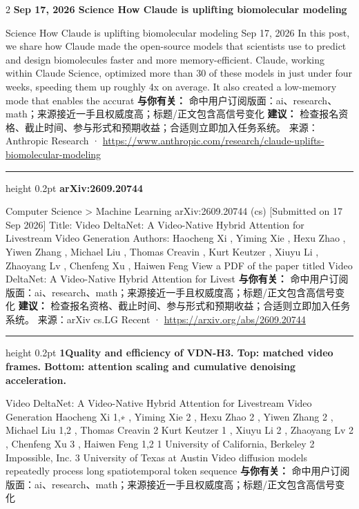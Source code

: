 \documentclass[10.5pt]{ctexart}
\begin{document}
\begin{multicols}{2}
{\large\bfseries Sep 17, 2026 Science How Claude is uplifting biomolecular modeling}\par
Science How Claude is uplifting biomolecular modeling Sep 17, 2026 In this post, we share how Claude made the open-source models that scientists use to predict and design biomolecules faster and more memory-efficient. Claude, working within Claude Science, optimized more than 30 of these models in just under four weeks, speeding them up roughly 4x on average. It also created a low-memory mode that enables the accurat
\textbf{与你有关：} 命中用户订阅版面：ai、research、math；来源接近一手且权威度高；标题/正文包含高信号变化
\textbf{建议：} 检查报名资格、截止时间、参与形式和预期收益；合适则立即加入任务系统。
{\footnotesize\color{ormuted} 来源：Anthropic Research · \url{https://www.anthropic.com/research/claude-uplifts-biomolecular-modeling}}
\vspace{2mm}
\hrule height 0.2pt
\vspace{2mm}
{\large\bfseries arXiv:2609.20744}\par
Computer Science > Machine Learning arXiv:2609.20744 (cs) [Submitted on 17 Sep 2026] Title: Video DeltaNet: A Video-Native Hybrid Attention for Livestream Video Generation Authors: Haocheng Xi , Yiming Xie , Hexu Zhao , Yiwen Zhang , Michael Liu , Thomas Creavin , Kurt Keutzer , Xiuyu Li , Zhaoyang Lv , Chenfeng Xu , Haiwen Feng View a PDF of the paper titled Video DeltaNet: A Video-Native Hybrid Attention for Livest
\textbf{与你有关：} 命中用户订阅版面：ai、research、math；来源接近一手且权威度高；标题/正文包含高信号变化
\textbf{建议：} 检查报名资格、截止时间、参与形式和预期收益；合适则立即加入任务系统。
{\footnotesize\color{ormuted} 来源：arXiv cs.LG Recent · \url{https://arxiv.org/abs/2609.20744}}
\vspace{2mm}
\hrule height 0.2pt
\vspace{2mm}
{\large\bfseries 1Quality and efficiency of VDN-H3. Top: matched video frames. Bottom: attention scaling and cumulative denoising acceleration.}\par
Video DeltaNet: A Video-Native Hybrid Attention for Livestream Video Generation Haocheng Xi 1,∗ , Yiming Xie 2 , Hexu Zhao 2 , Yiwen Zhang 2 , Michael Liu 1,2 , Thomas Creavin 2 Kurt Keutzer 1 , Xiuyu Li 2 , Zhaoyang Lv 2 , Chenfeng Xu 3 , Haiwen Feng 1,2 1 University of California, Berkeley 2 Impossible, Inc. 3 University of Texas at Austin Video diffusion models repeatedly process long spatiotemporal token sequence
\textbf{与你有关：} 命中用户订阅版面：ai、research、math；来源接近一手且权威度高；标题/正文包含高信号变化

\end{multicols}
\end{document}
